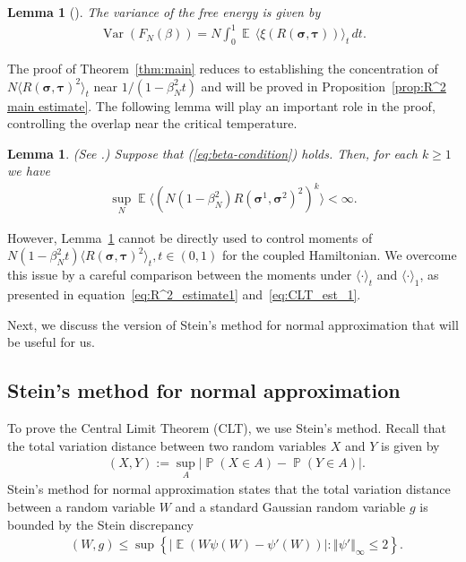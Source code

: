 \documentclass[letterpaper,11pt,reqno]{amsart}
\newtheorem{lem}[thm]{Lemma}
\renewcommand{\leq}{\leqslant}
\renewcommand{\geq}{\geqslant}
\newcommand{\ra}{\rangle}
\newcommand{\la}{\langle}
\newcommand{\norm}[1]{\left\Vert#1\right\Vert}
\newcommand{\abs}[1]{\left\vert#1\right\vert}
\newcommand{\mvgs}{\boldsymbol{\sigma}}\newcommand{\mvgS}{\boldsymbol{\Sigma}}\newcommand{\mvgt}{\boldsymbol{\tau}}
\DeclareMathOperator{\E}{\mathds{E}}
\DeclareMathOperator{\pr}{\mathds{P}}
\DeclareMathOperator{\var}{Var}
\DeclareMathOperator{\dtv}{d_{TV}}
\begin{document}
\begin{lem}[{\cite[Theorem 3.8]{Cha09}}] \label{lem:var-rep}
    The variance of the free energy is given by
    \begin{align*}
        \var(F_N(\beta)) = N \int_0^1 \E \, \la \xi(R(\mvgs, \mvgt)) \ra_t \, dt.
    \end{align*}
\end{lem}
The proof of Theorem~\ref{thm:main} reduces to establishing the concentration of $N \la R(\mvgs,\mvgt)^2 \ra_t$ near $1/(1-\beta_N^2t)$ and will be proved in Proposition~\ref{prop:R^2 main estimate}. The following lemma will play an important role in the proof, controlling the overlap near the critical temperature.
\begin{lem}\label{lem:R^k_estimate_tal}
    \textnormal{(See \cite[Theorems~11.7.1 and~11.7.2]{Tal2}.)}
    Suppose that (\ref{eq:beta-condition}) holds. 
    Then, for each \(k \geq 1\) we have
    \begin{align*}
    \sup_N \E \la ( N (1-\beta_N^2)R(\mvgs^1, \mvgs^2)^2 )^k\ra < \infty.
    \end{align*}
\end{lem}
However, Lemma~\ref{lem:R^k_estimate_tal} cannot be directly used to control moments of $N(1-\beta_N^{2}t)\la R(\mvgs, \mvgt)^2\ra_{t}, t\in(0,1)$ for the coupled Hamiltonian. We overcome this issue by a careful comparison between the moments under $\la\cdot\ra_{t}$ and $\la \cdot\ra_{1}$, as presented in equation~\eqref{eq:R^2_estimate1} and~\eqref{eq:CLT_est_1}.







Next, we discuss the version of Stein's method for normal approximation that will be useful for us. 

\subsection{Stein's method for normal approximation}
To prove the Central Limit Theorem (CLT), we use Stein's method.
Recall that the total variation distance between two random variables \(X\) and \(Y\) is given by
\begin{align*}
\dtv(X,Y) := \sup_A \abs{ \pr ( X \in A) - \pr ( Y \in A ) }. 
\end{align*}
Stein's method for normal approximation states that the total variation distance between a random variable $W$ and a standard Gaussian random variable $g$ is bounded by the Stein discrepancy
\begin{align}\label{eq:steins_method}
    \dtv(W, g) \leq \sup \left\{ \abs{\E (W \psi(W) - \psi' (W))} : \norm{\psi'}_\infty \leq 2\right\}.
\end{align}
\end{document}
